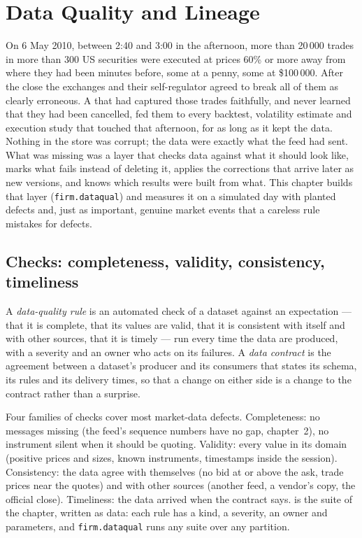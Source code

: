 \chapter{Data Quality and Lineage}\label{ch:pl:data-quality-and-lineage}

On 6 May 2010, between 2:40 and 3:00 in the afternoon, more than 20\,000 trades in more than 300 US securities were executed at
prices 60\% or more away from where they had been minutes before, some at a penny, some at \$100\,000. After the close the
exchanges and their self-regulator agreed to break all of them as clearly erroneous. A  that had captured those
trades faithfully, and never learned that they had been cancelled, fed them to every backtest, volatility estimate and
execution study that touched that afternoon, for as long as it kept the data. Nothing in the store was corrupt; the data were
exactly what the feed had sent. What was missing was a layer that checks data against what it should look like, marks what
fails instead of deleting it, applies the corrections that arrive later as new versions, and knows which results were built
from what. This chapter builds that layer (\texttt{firm.dataqual}) and measures it on a simulated day with planted defects and,
just as important, genuine market events that a careless rule mistakes for defects.

\section{Checks: completeness, validity, consistency, timeliness}

\begin{definition}\label{def:pl:data-quality-and-lineage:rule}
A \emph{data-quality rule} is an automated check of a dataset against an expectation --- that it is
complete, that its values are valid, that it is consistent with itself and with other sources, that it is timely --- run every
time the data are produced, with a severity and an owner who acts on its failures. A \emph{data contract}
is the agreement between a dataset's producer and its consumers that states its schema, its rules and its delivery times, so
that a change on either side is a change to the contract rather than a surprise.
\end{definition}

Four families of checks cover most market-data defects. Completeness: no messages missing (the feed's sequence numbers have no
gap, chapter~2), no instrument silent when it should be quoting. Validity: every value in its domain (positive prices and sizes,
known instruments, timestamps inside the session). Consistency: the data agree with themselves (no bid at or above the ask, trade
prices near the quotes) and with other sources (another feed, a vendor's copy, the official close). Timeliness: the data arrived
when the contract says.  is the suite of the chapter, written as data: each rule has
a kind, a severity, an owner and parameters, and \texttt{firm.dataqual} runs any suite over any partition.

